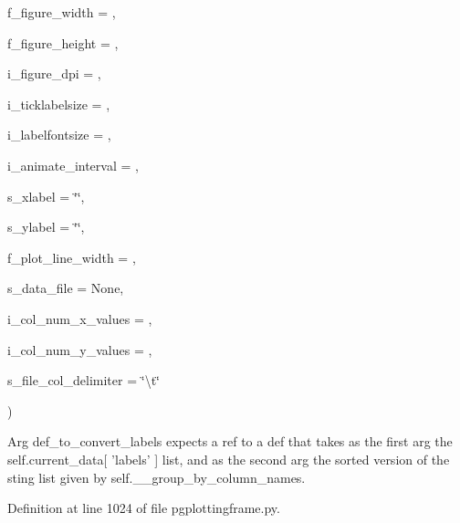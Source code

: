 {\begin{DoxyParamCaption}
\item[{}]{f\+\_\+figure\+\_\+width = {}, }
\item[{}]{f\+\_\+figure\+\_\+height = {}, }
\item[{}]{i\+\_\+figure\+\_\+dpi = {}, }
\item[{}]{i\+\_\+ticklabelsize = {}, }
\item[{}]{i\+\_\+labelfontsize = {}, }
\item[{}]{i\+\_\+animate\+\_\+interval = {}, }
\item[{}]{s\+\_\+xlabel = {\ttfamily \char`\"{}\char`\"{}}, }
\item[{}]{s\+\_\+ylabel = {\ttfamily \char`\"{}\char`\"{}}, }
\item[{}]{f\+\_\+plot\+\_\+line\+\_\+width = {}, }
\item[{}]{s\+\_\+data\+\_\+file = {\ttfamily None}, }
\item[{}]{i\+\_\+col\+\_\+num\+\_\+x\+\_\+values = {}, }
\item[{}]{i\+\_\+col\+\_\+num\+\_\+y\+\_\+values = {}, }
\item[{}]{s\+\_\+file\+\_\+col\+\_\+delimiter = {\ttfamily \char`\"{}\textbackslash{}t\char`\"{}}}
\end{DoxyParamCaption}
)}\hypertarget{classnegui_1_1pgplottingframe_1_1PGPlottingFrameBoxplotFromFileManager_a1485197b57dfbe589dce3ae7ab31d91b}{}\label{classnegui_1_1pgplottingframe_1_1PGPlottingFrameBoxplotFromFileManager_a1485197b57dfbe589dce3ae7ab31d91b}
\begin{DoxyVerb}Arg def_to_convert_labels expects a ref to a def
that takes as the first arg the self.current_data[ 'labels' ]
list, and as the second arg the sorted version of the sting list 
given by self.__group_by_column_names.
\end{DoxyVerb}
 

Definition at line 1024 of file pgplottingframe.\+py.


